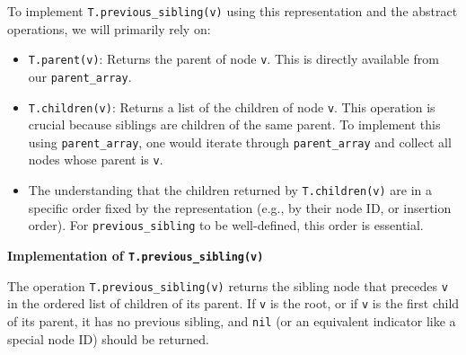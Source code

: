 \documentclass{article}
\begin{document}
To implement \texttt{T.previous\_sibling(v)} using this representation and the abstract operations, we will primarily rely on:
\begin{itemize}
    \item \texttt{T.parent(v)}: Returns the parent of node \texttt{v}. This is directly available from our \texttt{parent\_array}.
    \item \texttt{T.children(v)}: Returns a list of the children of node \texttt{v}. This operation is crucial because siblings are children of the same parent. To implement this using \texttt{parent\_array}, one would iterate through \texttt{parent\_array} and collect all nodes whose parent is \texttt{v}.
    \item The understanding that the children returned by \texttt{T.children(v)} are in a specific order fixed by the representation (e.g., by their node ID, or insertion order). For \texttt{previous\_sibling} to be well-defined, this order is essential.
\end{itemize}

\textbf{Implementation of \texttt{T.previous\_sibling(v)}}

The operation \texttt{T.previous\_sibling(v)} returns the sibling node that precedes \texttt{v} in the ordered list of children of its parent. If \texttt{v} is the root, or if \texttt{v} is the first child of its parent, it has no previous sibling, and \texttt{nil} (or an equivalent indicator like a special node ID) should be returned.
\end{document}
